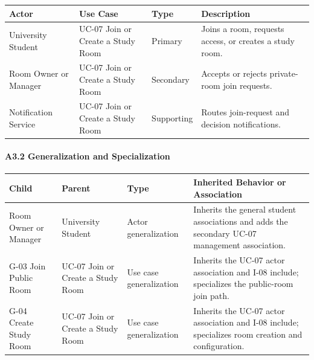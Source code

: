 \documentclass[12pt]{article}
\renewcommand{\baselinestretch}{1.5}
\begin{document}
\begingroup
\small
\renewcommand{\baselinestretch}{1.0}\selectfont
\renewcommand{\arraystretch}{1.15}
\setlength{\tabcolsep}{6pt}
\begin{longtable}{|>{\raggedright\arraybackslash}p{}|>{\raggedright\arraybackslash}p{}|>{\raggedright\arraybackslash}p{}|>{\raggedright\arraybackslash}p{}|}
\hline
\textbf{Actor} & \textbf{Use Case} & \textbf{Type} & \textbf{Description} \\ \hline
\endhead
University Student & UC-07 Join or Create a Study Room & Primary & Joins a room, requests access, or creates a study room. \\ \hline
Room Owner or Manager & UC-07 Join or Create a Study Room & Secondary & Accepts or rejects private-room join requests. \\ \hline
Notification Service & UC-07 Join or Create a Study Room & Supporting & Routes join-request and decision notifications. \\ \hline
\end{longtable}
\endgroup
\par\medskip

\hypertarget{sec:a3-2-generalization-and-specialization}{}
\paragraph*{A3.2 Generalization and Specialization}
\par\medskip

\begingroup
\small
\renewcommand{\baselinestretch}{1.0}\selectfont
\renewcommand{\arraystretch}{1.15}
\setlength{\tabcolsep}{6pt}
\begin{longtable}{|>{\raggedright\arraybackslash}p{}|>{\raggedright\arraybackslash}p{}|>{\raggedright\arraybackslash}p{}|>{\raggedright\arraybackslash}p{}|}
\hline
\textbf{Child} & \textbf{Parent} & \textbf{Type} & \textbf{Inherited Behavior or Association} \\ \hline
\endhead
Room Owner or Manager & University Student & Actor generalization & Inherits the general student associations and adds the secondary UC-07 management association. \\ \hline
G-03 Join Public Room & UC-07 Join or Create a Study Room & Use case generalization & Inherits the UC-07 actor association and I-08 include; specializes the public-room join path. \\ \hline
G-04 Create Study Room & UC-07 Join or Create a Study Room & Use case generalization & Inherits the UC-07 actor association and I-08 include; specializes room creation and configuration. \\ \hline
\end{longtable}
\endgroup
\par\medskip
\end{document}

